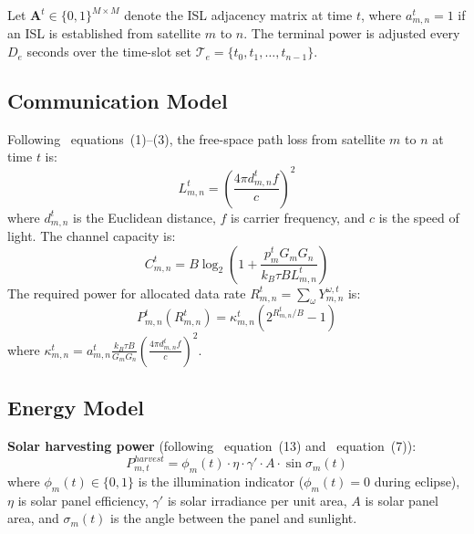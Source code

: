 \documentclass[journal]{IEEEtran}
\newcommand{\Pharvest}{P^{harvest}}
\begin{document}
Let $\mathbf{A}^t \in \{0,1\}^{M \times M}$ denote the ISL adjacency matrix at time $t$, where $a_{m,n}^t = 1$ if an ISL is established from satellite $m$ to $n$. The terminal power is adjusted every $D_e$ seconds over the time-slot set $\mathcal{T}_e = \{t_0, t_1, \ldots, t_{n-1}\}$.

\subsection{Communication Model}

Following~\cite{satflow} equations~(1)--(3), the free-space path loss from satellite $m$ to $n$ at time $t$ is:
\begin{equation}
    L_{m,n}^t = \left(\frac{4\pi d_{m,n}^t f}{c}
    \right)^2
    \label{eq:pathloss}
\end{equation}
where $d_{m,n}^t$ is the Euclidean distance, $f$ is carrier frequency, and $c$ is the speed of light. The channel capacity is:
\begin{equation}
    C_{m,n}^t = B\log_2\!\left(1 +
    \frac{p_m^t G_m G_n}{k_B \tau B L_{m,n}^t}
    \right)
    \label{eq:capacity}
\end{equation}
The required power for allocated data rate $R_{m,n}^t = \sum_{\omega} Y_{m,n}^{\omega,t}$ is:
\begin{equation}
    P_{m,n}^t(R_{m,n}^t) = \kappa_{m,n}^t
    \!\left(2^{R_{m,n}^t/B} - 1\right)
    \label{eq:power_rate}
\end{equation}
where $\kappa_{m,n}^t = a_{m,n}^t
\frac{k_B\tau B}{G_m G_n}
\!\left(\frac{4\pi d_{m,n}^t f}{c}\right)^{\!2}$.

\subsection{Energy Model}

\textbf{Solar harvesting power}
(following~\cite{li2023energy} equation~(13) and~\cite{li2023deepisl} equation~(7)):
\begin{equation}
    \Pharvest_{m,t} = \phi_m(t)\cdot\eta\cdot
    \gamma'\cdot A\cdot\sin\sigma_m(t)
    \label{eq:harvest}
\end{equation}
where $\phi_m(t)\in\{0,1\}$ is the illumination indicator ($\phi_m(t)=0$ during eclipse), $\eta$ is solar panel efficiency, $\gamma'$ is solar irradiance per unit area, $A$ is solar panel area, and $\sigma_m(t)$ is the angle between the panel and sunlight.
\end{document}
